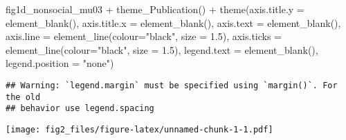 \documentclass[
]{article}
\newenvironment{Shaded}{\begin{snugshade}}{\end{snugshade}}
\newcommand{\AttributeTok}[1]{\textcolor[rgb]{0.77,0.63,0.00}{#1}}
\newcommand{\FloatTok}[1]{\textcolor[rgb]{0.00,0.00,0.81}{#1}}
\newcommand{\FunctionTok}[1]{\textcolor[rgb]{0.00,0.00,0.00}{#1}}
\newcommand{\NormalTok}[1]{#1}
\newcommand{\SpecialCharTok}[1]{\textcolor[rgb]{0.00,0.00,0.00}{#1}}
\newcommand{\StringTok}[1]{\textcolor[rgb]{0.31,0.60,0.02}{#1}}
\begin{document}
\begin{Shaded}
\begin{Highlighting}[]
\NormalTok{fig1d\_nonsocial\_mu03 }\SpecialCharTok{+} \FunctionTok{theme\_Publication}\NormalTok{() }\SpecialCharTok{+} \FunctionTok{theme}\NormalTok{(}\AttributeTok{axis.title.y =} \FunctionTok{element\_blank}\NormalTok{(),}
                                                   \AttributeTok{axis.title.x =} \FunctionTok{element\_blank}\NormalTok{(),}
                                                   \AttributeTok{axis.text =} \FunctionTok{element\_blank}\NormalTok{(), }
                                                   \AttributeTok{axis.line =} \FunctionTok{element\_line}\NormalTok{(}\AttributeTok{colour=}\StringTok{"black"}\NormalTok{, }\AttributeTok{size =} \FloatTok{1.5}\NormalTok{),}
                                                   \AttributeTok{axis.ticks =} \FunctionTok{element\_line}\NormalTok{(}\AttributeTok{colour=}\StringTok{"black"}\NormalTok{, }\AttributeTok{size =} \FloatTok{1.5}\NormalTok{),}
                                                   \AttributeTok{legend.text =} \FunctionTok{element\_blank}\NormalTok{(),}
                                                   \AttributeTok{legend.position =} \StringTok{"none"}\NormalTok{)}
\end{Highlighting}
\end{Shaded}

\begin{verbatim}
## Warning: `legend.margin` must be specified using `margin()`. For the old
## behavior use legend.spacing
\end{verbatim}

\texttt{[image: fig2\_files/figure-latex/unnamed-chunk-1-1.pdf]}
\end{document}
